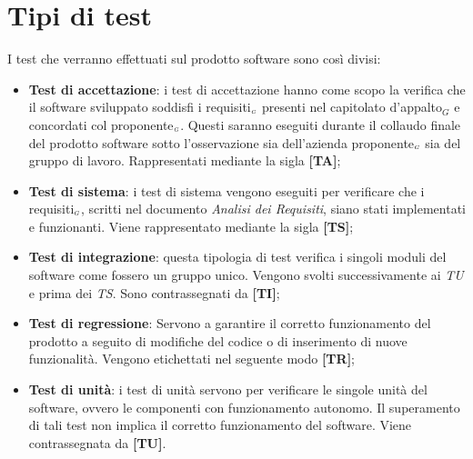 \section{Tipi di test} \label{SpecificaDeiTestTipiDiTest}
I test che verranno effettuati sul prodotto software sono così divisi:
\begin{itemize}
	\item \textbf{Test di accettazione}: i test di accettazione hanno come scopo la verifica che il software sviluppato soddisfi i requisiti$_{\scaleto{G}{3pt}}$ presenti nel capitolato d’appalto$_G$ e concordati col proponente$_{\scaleto{G}{3pt}}$.
	Questi saranno eseguiti durante il collaudo finale del prodotto software sotto l'osservazione sia dell'azienda proponente$_{\scaleto{G}{3pt}}$ sia del gruppo di lavoro.
	Rappresentati mediante la sigla \textbf{[TA]};

	\item \textbf{Test di sistema}: i test di sistema vengono eseguiti per verificare che i requisiti$_{\scaleto{G}{3pt}}$, scritti nel documento \textit{Analisi dei Requisiti}, siano stati implementati e funzionanti.
	Viene rappresentato mediante la sigla \textbf{[TS]};

	\item \textbf{Test di integrazione}: questa tipologia di test verifica i singoli moduli del software come fossero un gruppo unico.
	Vengono svolti successivamente ai \textit{TU} e prima dei \textit{TS}.
	Sono contrassegnati da \textbf{[TI]};

	\item \textbf{Test di regressione}: Servono a garantire il corretto funzionamento del prodotto a seguito di modifiche del codice o di inserimento di nuove funzionalità.
	Vengono etichettati nel seguente modo \textbf{[TR]};

	\item \textbf{Test di unità}: i test di unità servono per verificare le singole unità del software, ovvero le componenti con funzionamento autonomo.
	Il superamento di tali test non implica il corretto funzionamento del software.
	Viene contrassegnata da \textbf{[TU]}.
\end{itemize}

